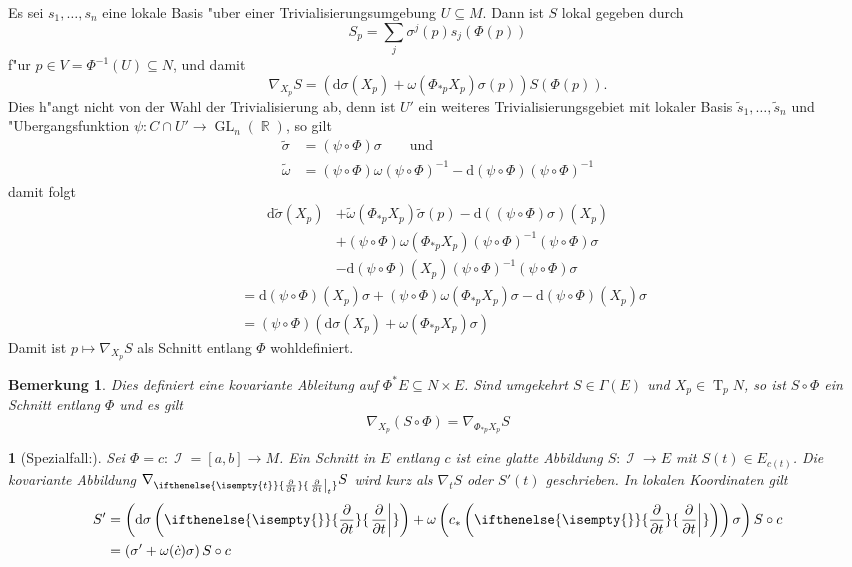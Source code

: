 \documentclass[paper=A4, twoside, chapterprefix=true, bibliography=totoc, headsepline]{scrbook}
\DeclareMathOperator{\R}{\mathbb{R}}
\DeclareMathOperator{\calI}{\mathcal{I}}
\DeclareMathOperator{\GL}{GL}       %
\DeclareMathOperator{\T}{T}         %
\newcommand{\dop}{\mathrm{d}}
\newcommand{\X}{\times}
\newcommand{\pdifffrac}[3][]{\ifthenelse{\isempty{#1}}{\frac{\partial #2}{\partial #3}}{\left. \frac{\partial #2}{\partial #3} \right|_{#1}}}
\theoremstyle{plain}
\theoremstyle{nonumberplain}
\newtheorem{bem}{Bemerkung}
\theoremstyle{empty}
\newtheorem{emptythm}{}%
\theoremstyle{break}
\begin{document}
Es sei $s_1,\ldots ,s_n$ eine lokale Basis "uber einer Trivialisierungsumgebung $U \subseteq M$. Dann ist $S$ lokal gegeben durch
\[ S_p = \sum_j \sigma^j(p) s_j(\Phi(p)) \]
f"ur $p \in V = \Phi^{-1}(U) \subseteq N$, und damit
\[ \nabla_{X_p}S = \left( \dop \sigma(X_p) + \omega(\Phi_{*p}X_p) \sigma(p) \right) S(\Phi(p)).\]
Dies h"angt nicht von der Wahl der Trivialisierung ab, denn ist $U'$ ein weiteres Trivialisierungsgebiet mit lokaler Basis $\tilde s_1, \ldots , \tilde s_n$ und "Ubergangsfunktion $\psi: C \cap U' \to \GL_n(\R)$, so gilt
\begin{align*}
  \tilde\sigma &= (\psi \circ \Phi) \sigma \qquad \text{und}\\
  \tilde\omega &= (\psi \circ \Phi) \omega(\psi \circ \Phi)^{-1} - \dop (\psi \circ \Phi)(\psi \circ \Phi)^{-1}
\end{align*}
damit folgt
\begin{align*}
  \dop \tilde\sigma(X_p) &+ \tilde\omega(\Phi_{*p}X_p) \tilde\sigma(p) - \dop((\psi \circ \Phi)\sigma) (X_p)\\
  &+ (\psi \circ \Phi) \omega (\Phi_{*p}X_p)(\psi \circ \Phi)^{-1}(\psi \circ \Phi)\sigma\\
  &- \dop(\psi \circ \Phi)(X_p)(\psi \circ \Phi)^{-1}(\psi \circ \Phi)\sigma
\end{align*}\begin{align*}
  &= \dop(\psi \circ \Phi)(X_p)\sigma + (\psi \circ \Phi)\omega(\Phi_{*p}X_p)\sigma - \dop(\psi \circ \Phi)(X_p)\sigma\\
  &= (\psi \circ \Phi)(\dop\sigma(X_p) + \omega(\Phi_{*p}X_p)\sigma)
\end{align*}
Damit ist $p \mapsto \nabla_{X_p}S$ als Schnitt entlang $\Phi$ wohldefiniert.
\begin{bem}
  Dies definiert eine kovariante Ableitung auf $\Phi^*E \subseteq N \X E$.
  Sind umgekehrt $S \in \Gamma(E)$ und $X_p \in \T_pN$, so ist $S \circ \Phi$ ein Schnitt entlang $\Phi$ und es gilt
  \[ \nabla_{X_p}(S \circ \Phi) = \nabla_{\Phi_{*p}X_p}S \]
\end{bem}

\begin{emptythm}[Spezialfall:]
  Sei $\Phi = c : \calI = [a,b] \to M$.
  Ein Schnitt in $E$ entlang $c$ ist eine glatte Abbildung $S: \calI \to E$ mit $S(t) \in E_{c(t)}$.
  Die kovariante Abbildung $\nabla_{\pdifffrac[t]{}{t}} S$ wird kurz als $\nabla_tS$ oder $S'(t)$ geschrieben.
  In lokalen Koordinaten gilt
  \begin{align*}
    S' &= \left( \dop \sigma \left( \pdifffrac{}{t} \right) + \omega\left( c_* \left( \pdifffrac{}{t} \right) \right) \sigma \right) S \circ c\\
    &= \left( \sigma' + \omega(\dot c) \sigma \right) S \circ c
  \end{align*}
\end{emptythm}
\end{document}
